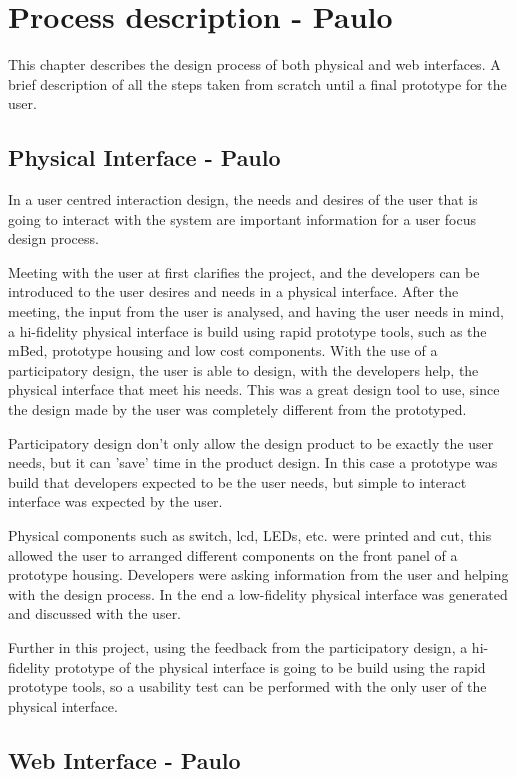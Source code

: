 \chapter{Process description - Paulo}

This chapter describes the design process of both physical and web interfaces. A brief description of all the steps taken from scratch until a final prototype for the user.

\section{Physical Interface - Paulo}

In a user centred interaction design, the needs and desires of the user that is going to interact with the system are important information for a user focus design process.

Meeting with the user at first clarifies the project, and the developers can be introduced to the user desires and needs in a physical interface. After the meeting, the input from the user is analysed, and having the user needs in mind, a hi-fidelity physical interface is build using rapid prototype tools, such as the mBed, prototype housing and low cost components.
With the use of a participatory design, the user is able to design, with the developers help, the physical interface that meet his needs. This was a great design tool to use, since the design made by the user was completely different from the prototyped.

Participatory design don't only allow the design product to be exactly the user needs, but it can 'save' time in the product design. In this case a prototype was build that developers expected to be the user needs, but simple to interact interface was expected by the user.

Physical components such as switch, lcd, LEDs, etc. were printed and cut, this allowed the user to arranged different components on the front panel of a prototype housing. Developers were asking information from the user and helping with the design process. In the end a low-fidelity physical interface was generated and discussed with the user.

Further in this project, using the feedback from the participatory design, a hi-fidelity prototype of the physical interface is going to be build using the rapid prototype tools, so a usability test can be performed with the only user of the physical interface.

\section{Web Interface - Paulo} 

